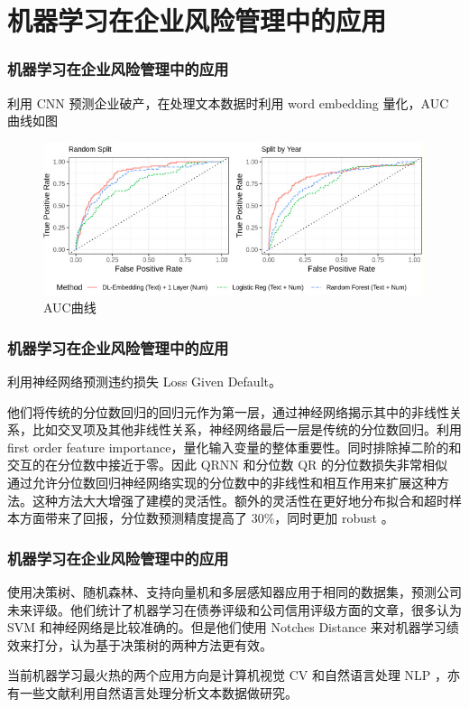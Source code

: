 \section{机器学习在企业风险管理中的应用}

\begin{frame}
    \frametitle{机器学习在企业风险管理中的应用}
    \Textcite{mai2019deep} 利用 CNN 预测企业破产，在处理文本数据时利用 word embedding 量化，AUC 曲线如图
    \begin{figure}
        \includegraphics[width=\linewidth]{../lib/mlinerm.jpg}
        \caption{AUC曲线}
    \end{figure}
\end{frame}
\begin{frame}
    \frametitle{机器学习在企业风险管理中的应用}
    \Textcite{kellner2022opening} 利用神经网络预测违约损失 Loss Given Default。

    他们将传统的分位数回归的回归元作为第一层，通过神经网络揭示其中的非线性关系，比如交叉项及其他非线性关系，神经网络最后一层是传统的分位数回归。利用 first order feature importance，量化输入变量的整体重要性。同时排除掉二阶的和交互的在分位数中接近于零。因此 QRNN 和分位数 QR 的分位数损失非常相似
    通过允许分位数回归神经网络实现的分位数中的非线性和相互作用来扩展这种方法。这种方法大大增强了建模的灵活性。额外的灵活性在更好地分布拟合和超时样本方面带来了回报，分位数预测精度提高了 30\%，同时更加 robust 。
\end{frame}
\begin{frame}
    \frametitle{机器学习在企业风险管理中的应用}
    \Textcite{golbayani2020comparative}
    使用决策树、随机森林、支持向量机和多层感知器应用于相同的数据集，预测公司未来评级。他们统计了机器学习在债券评级和公司信用评级方面的文章，很多认为 SVM
    和神经网络是比较准确的。但是他们使用 Notches Distance 来对机器学习绩效来打分，认为基于决策树的两种方法更有效。

    当前机器学习最火热的两个应用方向是计算机视觉 CV 和自然语言处理 NLP ，亦有一些文献利用自然语言处理分析文本数据做研究。
\end{frame}

